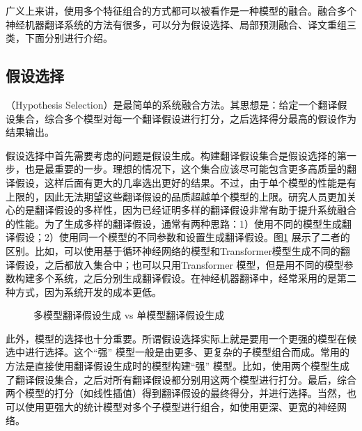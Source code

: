 \parinterval 广义上来讲，使用多个特征组合的方式都可以被看作是一种模型的融合。融合多个神经机器翻译系统的方法有很多，可以分为假设选择、局部预测融合、译文重组三类，下面分别进行介绍。


\subsection{假设选择}

（Hypothesis Selection）是最简单的系统融合方法。其思想是：给定一个翻译假设集合，综合多个模型对每一个翻译假设进行打分，之后选择得分最高的假设作为结果输出。

\parinterval 假设选择中首先需要考虑的问题是假设生成。构建翻译假设集合是假设选择的第一步，也是最重要的一步。理想的情况下，这个集合应该尽可能包含更多高质量的翻译假设，这样后面有更大的几率选出更好的结果。不过，由于单个模型的性能是有上限的，因此无法期望这些翻译假设的品质超越单个模型的上限。研究人员更加关心的是翻译假设的多样性，因为已经证明多样的翻译假设非常有助于提升系统融合的性能。为了生成多样的翻译假设，通常有两种思路：1）使用不同的模型生成翻译假设；2）使用同一个模型的不同参数和设置生成翻译假设。图\ref{fig:14-8} 展示了二者的区别。比如，可以使用基于循环神经网络的模型和Transformer模型生成不同的翻译假设，之后都放入集合中；也可以只用Transformer 模型，但是用不同的模型参数构建多个系统，之后分别生成翻译假设。在神经机器翻译中，经常采用的是第二种方式，因为系统开发的成本更低。

\begin{figure}[htp]
\centering

\caption{多模型翻译假设生成 vs 单模型翻译假设生成}
\label{fig:14-8}
\end{figure}

\parinterval 此外，模型的选择也十分重要。所谓假设选择实际上就是要用一个更强的模型在候选中进行选择。这个“强” 模型一般是由更多、更复杂的子模型组合而成。常用的方法是直接使用翻译假设生成时的模型构建“强” 模型。比如，使用两个模型生成了翻译假设集合，之后对所有翻译假设都分别用这两个模型进行打分。最后，综合两个模型的打分（如线性插值）得到翻译假设的最终得分，并进行选择。当然，也可以使用更强大的统计模型对多个子模型进行组合，如使用更深、更宽的神经网络。

